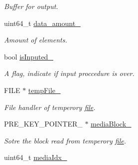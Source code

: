 \begin{CompactItemize}
\begin{CompactList}\small\item\em Buffer for output. \item\end{CompactList}\item 
\hypertarget{classAlphaSort_a29d14664fd9dd4a2997edd6d020f369}{
uint64\_\-t \hyperlink{classAlphaSort_a29d14664fd9dd4a2997edd6d020f369}{data\_\-amount\_\-}}
\label{classAlphaSort_a29d14664fd9dd4a2997edd6d020f369}

\begin{CompactList}\small\item\em Amount of elements. \item\end{CompactList}\item 
\hypertarget{classAlphaSort_f44534985845db7bc117359ac7d3cbf0}{
bool \hyperlink{classAlphaSort_f44534985845db7bc117359ac7d3cbf0}{isInputed\_\-}}
\label{classAlphaSort_f44534985845db7bc117359ac7d3cbf0}

\begin{CompactList}\small\item\em A flag, indicate if input proccedure is over. \item\end{CompactList}\item 
\hypertarget{classAlphaSort_1c64521052b1f1c9339ac23d70e6800f}{
FILE $\ast$ \hyperlink{classAlphaSort_1c64521052b1f1c9339ac23d70e6800f}{tempFile\_\-}}
\label{classAlphaSort_1c64521052b1f1c9339ac23d70e6800f}

\begin{CompactList}\small\item\em File handler of temperory \hyperlink{classfile}{file}. \item\end{CompactList}\item 
\hypertarget{classAlphaSort_1679ce648756bd410b2293536e8a1a89}{
PRE\_\-KEY\_\-POINTER\_\- $\ast$ \hyperlink{classAlphaSort_1679ce648756bd410b2293536e8a1a89}{mediaBlock\_\-}}
\label{classAlphaSort_1679ce648756bd410b2293536e8a1a89}

\begin{CompactList}\small\item\em Sotre the block read from temperory \hyperlink{classfile}{file}. \item\end{CompactList}\item 
\hypertarget{classAlphaSort_3015f7db00d3944b4d86b9a8f98eb716}{
uint64\_\-t \hyperlink{classAlphaSort_3015f7db00d3944b4d86b9a8f98eb716}{mediaIdx\_\-}}
\label{classAlphaSort_3015f7db00d3944b4d86b9a8f98eb716}


\end{CompactItemize}
